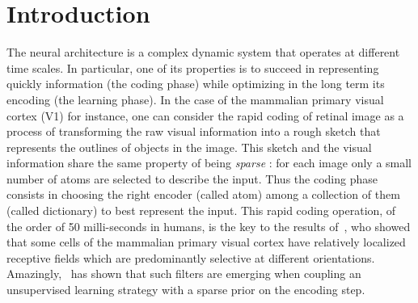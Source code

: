\documentclass[draft]{article} %
\title{\Title}
\author{%
\FirstNameA\ \AuthorA \and \FirstNameB\ \AuthorB \and \FirstNameC\ \AuthorC
}
\date{\Institute\ \\
\Organism\
}
\newcommand{\Abstract}{ %
The formation of structure in the brain, that is, of the connection between cells within neural populations, is by large an unsupervised learning process: The emergence of this architecture is mostly self-organized. In the primary visual cortex of mammals, for example, one may observe during development the emergence of cells selective to localized, oriented features. This leads to the development of a rough representation of contours of the retinal image in area V1. We modeled these mechanisms using sparse unsupervised learning algorithms. These algorithms alternate a coding phase to encode the information with a learning phase to find the proper encoder. A major difficulty faced by these types of algorithms is to deduce good representation while knowing immature encoders, and to learn good encoders with a non-optimal representation. To address this problem, we propose here to introduce a new regulation process between learning and coding, called homeostasis. Our homeostasis is compatible with a neuro-mimetic architecture and allows for the fast emergence of localized filters sensitive to orientation. The key to this algorithm lies in a simple adaptation mechanism based on non-linear functions that reconciles the antagonistic processes that occur at the coding and learning time scales. We tested this unsupervised algorithm with this homeostasis rule for a range of existing unsupervised learning algorithms coupled with different neural coding algorithms. In addition, we propose a simplification of this optimal homeostasis rule by implementing a simple heuristic on the probability of activation of neurons. Compared to the optimal homeostasis rule, we show that this heuristic allows to implement a more efficient unsupervised learning algorithm while keeping a large part of its effectiveness. These results demonstrate the potential application of such a strategy to the fast classification of images, for example in hierarchical and dynamic architectures.
}
\begin{document}
%
\maketitle
\begin{abstract}
\Abstract
\end{abstract}
\thispagestyle{empty}
\section{Introduction}\label{introduction}
The neural architecture is a complex dynamic system that operates at different time scales. In particular, one of its properties is to succeed in representing quickly information (the coding phase) while optimizing in the long term its encoding (the learning phase).
 In the case of the mammalian primary visual cortex (V1) for instance, one can consider the rapid coding of retinal image as a process of transforming the raw visual information into a rough sketch that represents the outlines of objects in the image.
This sketch and the visual information share the same property of being \emph{sparse} : for each image only a small number of atoms are selected to describe the input. Thus the coding phase consists in choosing the right encoder (called atom) among a collection of them (called dictionary) to  best represent the input.
This rapid coding operation, of the order of 50 milli-seconds in humans, is the key to the results of~\citet{Hubel68}, who showed that some cells of the mammalian primary visual cortex have relatively localized receptive fields which are predominantly selective at different orientations.
Amazingly,~\citet{Olshausen96} has shown that such filters are emerging when coupling an unsupervised learning strategy with a sparse prior on the encoding step.
\end{document}
